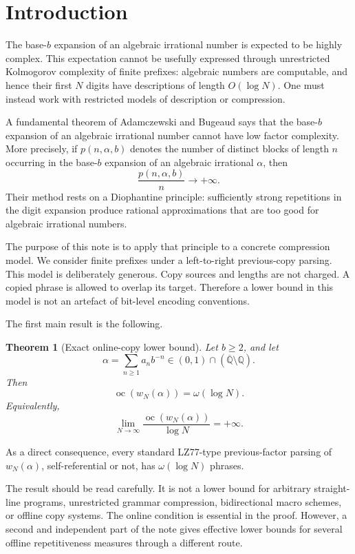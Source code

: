 \documentclass[11pt]{amsart}
\newtheorem{theorem}{Theorem}[section]
\theoremstyle{definition}
\DeclareMathOperator{\oc}{oc}
\begin{document}
\maketitle

\section{Introduction}

The base-\(b\) expansion of an algebraic irrational number is expected to be highly complex. This expectation cannot be usefully expressed through unrestricted Kolmogorov complexity of finite prefixes: algebraic numbers are computable, and hence their first \(N\) digits have descriptions of length \(O(\log N)\). One must instead work with restricted models of description or compression.

A fundamental theorem of Adamczewski and Bugeaud says that the base-\(b\) expansion of an algebraic irrational number cannot have low factor complexity. More precisely, if \(p(n,\alpha,b)\) denotes the number of distinct blocks of length \(n\) occurring in the base-\(b\) expansion of an algebraic irrational \(\alpha\), then
\[
\frac{p(n,\alpha,b)}{n}\longrightarrow +\infty.
\]
Their method rests on a Diophantine principle: sufficiently strong repetitions in the digit expansion produce rational approximations that are too good for algebraic irrational numbers.

The purpose of this note is to apply that principle to a concrete compression model. We consider finite prefixes under a left-to-right previous-copy parsing. This model is deliberately generous. Copy sources and lengths are not charged. A copied phrase is allowed to overlap its target. Therefore a lower bound in this model is not an artefact of bit-level encoding conventions.

The first main result is the following.

\begin{theorem}[Exact online-copy lower bound]
Let \(b\geq 2\), and let
\[
\alpha=\sum_{n\geq 1}a_n b^{-n}
\in (0,1)\cap(\overline{\mathbb Q}\setminus\mathbb Q).
\]
Then
\[
\oc(w_N(\alpha))=\omega(\log N).
\]
Equivalently,
\[
\lim_{N\to\infty}
\frac{\oc(w_N(\alpha))}{\log N}
=
+\infty.
\]
\end{theorem}

As a direct consequence, every standard LZ77-type previous-factor parsing of \(w_N(\alpha)\), self-referential or not, has \(\omega(\log N)\) phrases.

The result should be read carefully. It is not a lower bound for arbitrary straight-line programs, unrestricted grammar compression, bidirectional macro schemes, or offline copy systems. The online condition is essential in the proof. However, a second and independent part of the note gives effective lower bounds for several offline repetitiveness measures through a different route.
\end{document}
